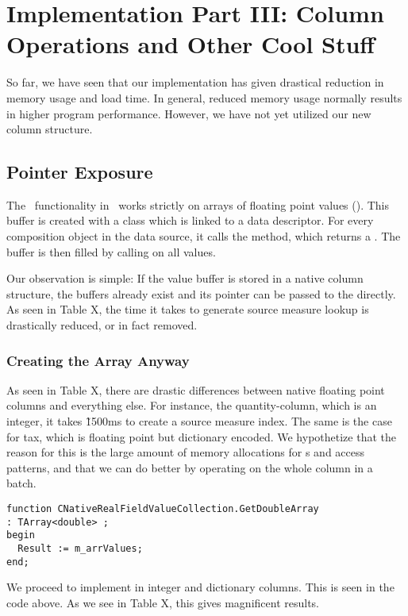\chapter{Implementation Part III: Column Operations and Other Cool Stuff}
\label{chap:Implementation Part III: Column Operations and Other Cool Stuff}
So far, we have seen that our implementation has given drastical reduction in memory usage and load time. In general, reduced memory usage normally results in higher program performance. However, we have not yet utilized our new column structure.

\section{Pointer Exposure}
\label{sec:Pointer Exposure}
The \bd~functionality in \gap~works strictly on arrays of floating point values (). This buffer is created with a  class which is linked to a data descriptor. For every composition object in the data source, it calls the  method, which returns a . The buffer is then filled by calling  on all values. 

Our observation is simple: If the value buffer is stored in a native column structure, the buffers already exist and its pointer can be passed to the  directly. As seen in Table X, the time it takes to generate source measure lookup is drastically reduced, or in fact removed.

\subsection{Creating the Array Anyway}
\label{sub:Creating the Array Anyway}
As seen in Table X, there are drastic differences between native floating point columns and everything else. For instance, the quantity-column, which is an integer, it takes \~ 1500ms to create a source measure index. The same is the case for tax, which is floating point but dictionary encoded. We hypothetize that the reason for this is the large amount of memory allocations for s and access patterns, and that we can do better by operating on the whole column in a batch.
\begin{lstlisting}
function CNativeRealFieldValueCollection.GetDoubleArray
: TArray<double> ;
begin
  Result := m_arrValues;
end;
\end{lstlisting}
We proceed to implement  in integer and dictionary columns. This is seen in the code above. As we see in Table X, this gives magnificent results.

